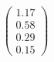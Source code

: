 \documentclass[preview]{standalone}
\begin{document}
\begin{align*}
\begin{pmatrix} 1.17 \\ 0.58 \\ 0.29 \\ 0.15 \end{pmatrix}
\end{align*}
\end{document}
